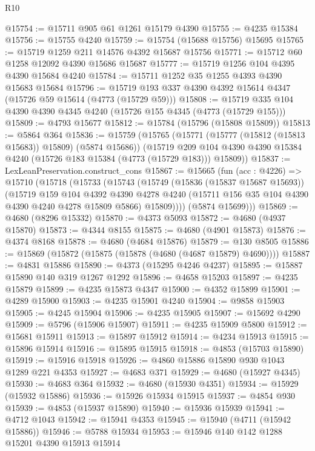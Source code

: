 \begin{lexlean}{R10}
\begin{coremodule}
@15754 := @15711 @905 @61 @1261 @15179 @4390
@15755 := @4235 @15384
@15756 := @15755 @4240
@15759 := @15754 (@15688 @15756) @15695
@15765 := @15719 @1259 @211 @14576 @4392 @15687 @15756
@15771 := @15712 @60 @1258 @12092 @4390 @15686 @15687
@15777 := @15719 @1256 @104 @4395 @4390 @15684 @4240
@15784 := @15711 @1252 @35 @1255 @4393 @4390 @15683 @15684
@15796 := @15719 @193 @337 @4390 @4392 @15614 @4347 (@15726 @59 @15614 (@4773 (@15729 @59)))
@15808 := @15719 @335 @104 @4390 @4390 @4345 @4240 (@15726 @155 @4345 (@4773 (@15729 @155)))
@15809 := @4793 @15677
@15812 := @15784 (@15796 (@15808 @15809))
@15813 := @5864 @364
@15836 := @15759
    (@15765
      (@15771 (@15777 (@15812 (@15813 @15683)) @15809) (@5874 @15686))
      (@15719 @209 @104 @4390 @4390 @15384 @4240 (@15726 @183 @15384 (@4773 (@15729 @183))) @15809))
@15837 := LexLeanPreservation.construct_cons
@15867 := @15665
    (fun (acc : @4226) =>
    @15710
      (@15718
        (@15733
          (@15743
            (@15749
              (@15836 (@15837 @15687 @15693))
              (@15719
                @159
                @104
                @4392
                @4390
                @4278
                @4240
                (@15711 @156 @35 @104 @4390 @4390 @4240 @4278 @15809 @5866)
                @15809))))
        (@5874 @15699)))
@15869 := @4680 (@8296 @15332)
@15870 := @4373 @5093
@15872 := @4680 (@4937 @15870)
@15873 := @4344 @8155
@15875 := @4680 (@4901 @15873)
@15876 := @4374 @8168
@15878 := @4680 (@4684 @15876)
@15879 := @130 @8505
@15886 := @15869 (@15872 (@15875 (@15878 (@4680 (@4687 @15879) @4690))))
@15887 := @4831 @15886
@15890 := @4373 (@15295 @4246 @4237)
@15895 := @15887 @15890 @140 @319 @1267 @1292
@15896 := @4658 @15203
@15897 := @4235 @15879
@15899 := @4235 @15873 @4347
@15900 := @4352 @15899
@15901 := @4289 @15900
@15903 := @4235 @15901 @4240
@15904 := @9858 @15903
@15905 := @4245 @15904
@15906 := @4235 @15905
@15907 := @15692 @4290
@15909 := @5796 (@15906 @15907)
@15911 := @4235 @15909 @5800
@15912 := @15681 @15911
@15913 := @15897 @15912
@15914 := @4234 @15913
@15915 := @15896 @15914
@15916 := @15895 @15915
@15918 := @4853 (@15703 @15890)
@15919 := @15916 @15918
@15926 := @4860 @15886 @15890 @930 @1043 @1289 @221 @4353
@15927 := @4683 @371
@15929 := @4680 (@15927 @4345)
@15930 := @4683 @364
@15932 := @4680 (@15930 @4351)
@15934 := @15929 (@15932 @15886)
@15936 := @15926 @15934 @15915
@15937 := @4854 @930
@15939 := @4853 (@15937 @15890)
@15940 := @15936 @15939
@15941 := @4712 @1043
@15942 := @15941 @4353
@15945 := @15940 (@4711 (@15942 @15886))
@15946 := @5788 @15934
@15953 := @15946 @140 @142 @1288 @15201 @4390 @15913 @15914

\end{coremodule}
\end{lexlean}
